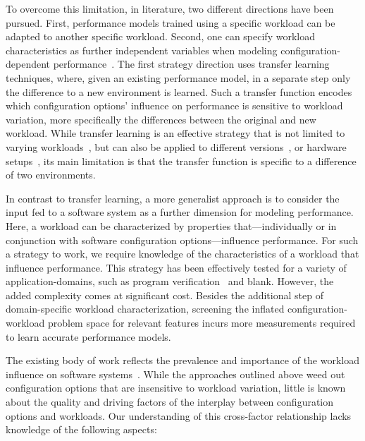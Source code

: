 To overcome this limitation, in literature, two different directions have been pursued. First, performance models trained using a specific workload can be adapted to another specific workload. Second,  one can specify workload characteristics as further independent variables when modeling configuration-dependent performance~\cite{koc_satune_2021}.
The first strategy direction uses transfer learning techniques, where, given an existing performance model, in a separate step only the difference to a new environment is learned. Such a transfer function encodes which configuration options’ influence on performance is sensitive to workload variation, more specifically the differences between the original and new workload. While transfer learning is an effective strategy that is not limited to varying workloads~\cite{jamshidi_learning_2018}, but can also be applied to different versions~\cite{jamishidi_transfer_2017,jamshidi_transfer_gp_2017,martin_transfer_2021}, or hardware setups~\cite{ding_bayesian_2020}, its main limitation is that the transfer function is specific to a difference of two environments.

In contrast to transfer learning, a more generalist approach is to consider the input fed to a software system as a further dimension for modeling performance. Here, a workload can be characterized by properties that---individually or in conjunction with software configuration options---influence performance. For such a strategy to work, we require knowledge of the characteristics of a workload that influence performance. This strategy has been effectively tested for a  variety of application-domains, such as program verification~\cite{koc_satune_2021} and {\color{red}blank}. However, the added complexity comes at significant cost. Besides the additional step of domain-specific workload characterization, screening the inflated configuration-workload problem space for relevant features incurs more measurements required to learn accurate performance models.  

The existing body of work reflects the prevalence and importance of the workload influence on software systems~\cite{}. While the approaches outlined above weed out configuration options that are insensitive to workload variation, little is known about the quality and driving factors of the interplay between configuration options and workloads. Our understanding of this cross-factor relationship lacks knowledge of the following aspects:

